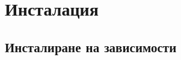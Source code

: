 \documentclass[a4paper]{article}
\def\jsg{JsGames}
\begin{document}
% 
% 
% 
% 

\section{Инсталация}

\subsection{Инсталиране на зависимости}
\end{document}
